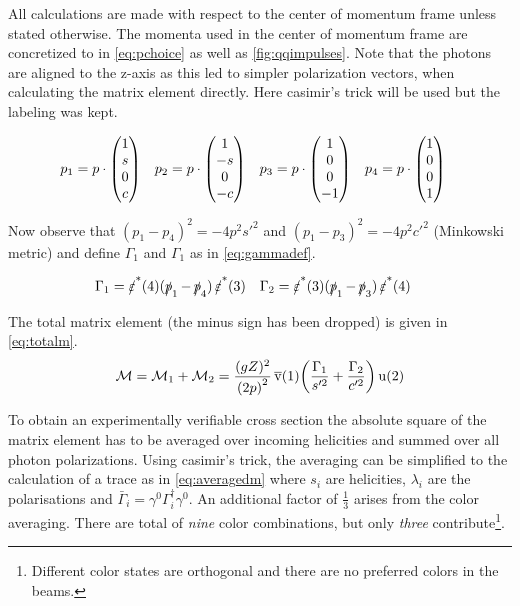 All calculations are made with respect to the center of momentum frame
unless stated otherwise. The momenta used in the center of momentum
frame are concretized to in \cref{eq:pchoice} as well
as \cref{fig:qqimpulses}.  Note that the photons are aligned to the
z-axis as this led to simpler polarization vectors, when calculating
the matrix element directly. Here casimir's trick will be used but the
labeling was kept.

\begin{align}
  \label{eq:pchoice}
  p_1&=p\cdot\mqty(1 \\ s \\ 0 \\ c)
     & p_2&=p\cdot\mqty(1 \\ -s \\ 0 \\ -c)
     & p_3&=p\cdot\mqty(1 \\ 0 \\ 0 \\ -1)
     & p_4&=p\cdot\mqty(1 \\ 0 \\ 0 \\ 1)
\end{align}

Now observe that \((p_1-p_4)^2=-4p^2s'^2\) and
\((p_1-p_3)^2=-4p^2c'^2\) (Minkowski metric) and define \(\Gamma_1\)
and \(\Gamma_1\) as in \cref{eq:gammadef}.

\begin{align}
  \label{eq:gammadef}
  \Gamma_1 &= \pses(4)(\ps_1 - \ps_4)\pses(3) &
  \Gamma_2 &= \pses(3)(\ps_1 - \ps_3)\pses(4)
\end{align}

The total matrix element (the minus sign has been dropped) is given in \cref{eq:totalm}.
\begin{equation}
  \label{eq:totalm}
  \mathcal{M} = \mathcal{M}_1 + \mathcal{M}_2 = \frac{(gZ)^2}{\qty(2p)^2}\operatorname*{\overline{v}}(1)\qty(\frac{\Gamma_1}{s'^2}+\frac{\Gamma_2}{c'^2})\operatorname{u}(2)
\end{equation}

To obtain an experimentally verifiable cross section the absolute
square of the matrix element has to be averaged over incoming
helicities and summed over all photon polarizations. Using casimir's
trick, the averaging can be simplified to the calculation of a trace
as in \cref{eq:averagedm} where \(s_i\) are helicities, \(\lambda_i\)
are the polarisations and
\(\bar{\Gamma}_i=\gamma^0\Gamma^\dagger_i\gamma^0\). An additional
factor of \(\frac{1}{3}\) arises from the color averaging. There are
total of \emph{nine} color combinations, but only \emph{three}
contribute\footnote{Different color states are orthogonal and there
  are no preferred colors in the beams.}.

